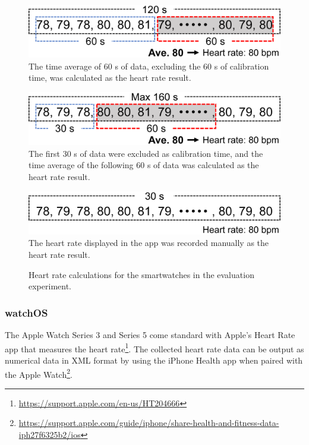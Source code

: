 \documentclass{ieeeaccess}
\begin{document}
\begin{figure}[!t]
  \centering
  \begin{minipage}[t]{1\linewidth}
    \centering
    \includegraphics[width=1\linewidth]{figures/calculating_wearos.eps}
    \small The time average of 60 s of data, excluding the 60 s of calibration time, was calculated as the heart rate result.
    \label{fig:calculating_wearos}
    \vspace{10pt}
  \end{minipage}
  \begin{minipage}[t]{1\linewidth}
    \centering
    \includegraphics[width=1\linewidth]{figures/calculating_watchos.eps}
    \small The first 30 s of data were excluded as calibration time, and the time average of the following 60 s of data was calculated as the heart rate result.
    \label{fig:calculating_watchos}
    \vspace{10pt}
  \end{minipage}
  \begin{minipage}[t]{1\linewidth}
    \centering
    \includegraphics[width=1\linewidth]{figures/calculating_smartos.eps}
    \small The heart rate displayed in the app was recorded manually as the heart rate result.
    \label{fig:calculating_smartos}
  \end{minipage}
  \caption{Heart rate calculations for the smartwatches in the evaluation experiment.}
  \label{fig:calculating_heart_rate}
\end{figure}

\subsubsection{watchOS}
The Apple Watch Series 3 and Series 5 come standard with Apple's Heart Rate app that measures the heart rate\footnote{\url{https://support.apple.com/en-us/HT204666}}. The collected heart rate data can be output as numerical data in XML format by using the iPhone Health app when paired with the Apple Watch\footnote{\url{https://support.apple.com/guide/iphone/share-health-and-fitness-data-iph27f6325b2/ios}}.\par
\end{document}
